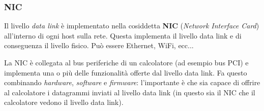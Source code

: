 \documentclass[a4paper,11pt]{article}
\begin{document}
\subsubsection{NIC}
Il livello \textit{data link} è implementato nella cosiddetta \textbf{NIC} (\textit{Network Interface Card}) all'interno di ogni host sulla rete. Questa implementa il livello data link e di conseguenza il livello fisico. Può essere Ethernet, WiFi, ecc...

La NIC è collegata al bus periferiche di un calcolatore (ad esempio bus PCI) e implementa una o più delle funzionalità offerte dal livello data link.
Fa questo combinando \textit{hardware}, \textit{software} e \textit{firmware}: l'importante è che sia capace di offrire al calcolatore i datagrammi inviati al livello data link (in questo sia il NIC che il calcolatore vedono il livello data link).
\end{document}
